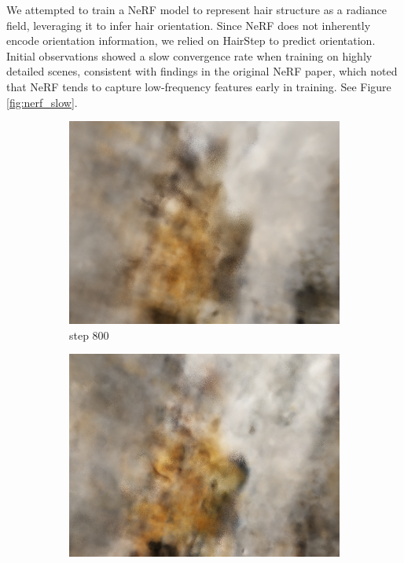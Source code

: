 \documentclass[12pt]{article}
\begin{document}
  We attempted to train a NeRF model to represent hair structure as a radiance field, leveraging it to infer hair orientation. Since NeRF does not inherently encode orientation information, we relied on HairStep to predict orientation. Initial observations showed a slow convergence rate when training on highly detailed scenes, consistent with findings in the original NeRF paper, which noted that NeRF tends to capture low-frequency features early in training. See Figure \ref{fig:nerf_slow}.
  \begin{figure}[h]
      \centering
      \begin{subfigure}{0.3\textwidth}
            \centering
            \includegraphics[width=\textwidth]{project-milestone/images/nerf_pred/nerf_800.png}
            \caption{step 800}
        \end{subfigure}
        \hfill
        \begin{subfigure}{0.3\textwidth}
            \centering
            \includegraphics[width=\textwidth]{project-milestone/images/nerf_pred/nerf_4000.png}

\end{subfigure}
\end{figure}
\end{document}
